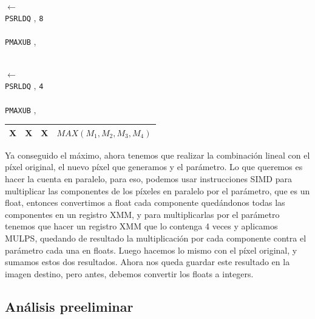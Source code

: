 \begin{center}
  \\
 $\leftarrow$  \\
\texttt{PSRLDQ} , \texttt{8} \hfill \\
  \\

\texttt{PMAXUB} ,  \hfill

  \\

 $\leftarrow$  \\
\texttt{PSRLDQ} , \texttt{4} \hfill \\
  \\

\texttt{PMAXUB} ,  \hfill \\

 \vspace{0.1cm}
\begin{tabular}{|C{1cm}|C{1cm}|C{1cm}|C{3.8cm}|}\hline
X & X & X & $MAX(M_1,M_2,M_3,M_4)$ \\ \hline
\end{tabular}
\vspace{0.1cm}

\end{center}

Ya conseguido el máximo, ahora tenemos que realizar la combinación lineal con el píxel original, el nuevo píxel que generamos y el parámetro. Lo que queremos es hacer la cuenta en paralelo, para eso, podemos usar instrucciones SIMD para multiplicar las componentes de los píxeles en paralelo por el parámetro, que es un float, entonces convertimos a float cada componente quedándonos todas las componentes en un registro XMM, y para multiplicarlas por el parámetro tenemos que hacer un registro XMM que lo contenga 4 veces y aplicamos MULPS, quedando de resultado la multiplicación por cada componente contra el parámetro cada una en floats. Luego hacemos lo mismo con el píxel original, y sumamos estos dos resultados. Ahora nos queda guardar este resultado en la imagen destino, pero antes, debemos convertir los floats a integers.

\subsection{Análisis preeliminar}
